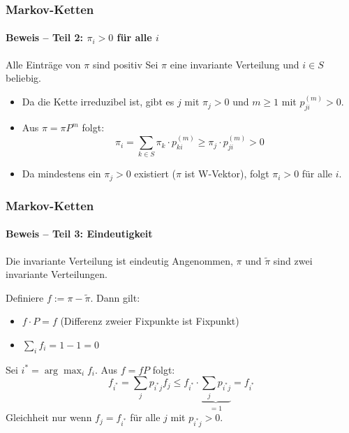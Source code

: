 \documentclass{beamer}
\begin{document}

\begin{frame}
    \frametitle{Markov-Ketten}
\framesubtitle{Beweis -- Teil 2: $\pi_i > 0$ für alle $i$}
    \begin{block}{Alle Einträge von $\pi$ sind positiv}
Sei $\pi$ eine invariante Verteilung und $i \in S$ beliebig.
\end{block}
\begin{itemize}
\item Da die Kette irreduzibel ist, gibt es $j$ mit $\pi_j > 0$ und $m \geq 1$ mit $p_{ji}^{(m)} > 0$.
\item Aus $\pi = \pi P^m$ folgt:
\[
\pi_i = \sum_{k \in S} \pi_k \cdot p_{ki}^{(m)} \geq \pi_j \cdot p_{ji}^{(m)} > 0
\]
\item Da mindestens ein $\pi_j > 0$ existiert ($\pi$ ist W-Vektor), folgt $\pi_i > 0$ für alle $i$.
\end{itemize}
 \end{frame}



\begin{frame}
    \frametitle{Markov-Ketten}
\framesubtitle{Beweis -- Teil 3: Eindeutigkeit}
    \begin{block}{Die invariante Verteilung ist eindeutig}
Angenommen, $\pi$ und $\tilde{\pi}$ sind zwei invariante Verteilungen.
\end{block}
Definiere $f := \pi - \tilde{\pi}$. Dann gilt:
\begin{itemize}
\item $f \cdot P = f$ \quad (Differenz zweier Fixpunkte ist Fixpunkt)
\item $\sum_i f_i = 1 - 1 = 0$
\end{itemize}
Sei $i^* = \arg\max_i f_i$. Aus $f = fP$ folgt:
\[
f_{i^*} = \sum_j p_{i^* j} f_j \leq f_{i^*} \cdot \underbrace{\sum_j p_{i^* j}}_{= 1} = f_{i^*}
\]
Gleichheit nur wenn $f_j = f_{i^*}$ für alle $j$ mit $p_{i^* j} > 0$.
 \end{frame}
\end{document}
